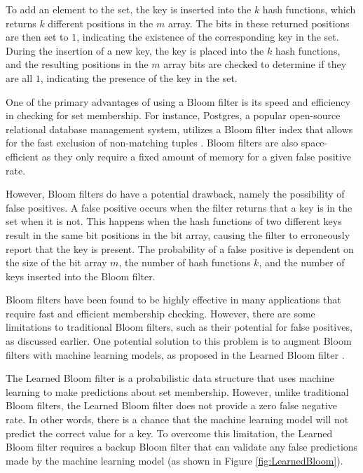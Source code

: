 To add an element to the set, the key is inserted into the $k$ hash functions, which returns $k$ different positions in the $m$ array. The bits in these returned positions are then set to $1$, indicating the existence of the corresponding key in the set. During the insertion of a new key, the key is placed into the $k$ hash functions, and the resulting positions in the $m$ array bits are checked to determine if they are all $1$, indicating the presence of the key in the set.

One of the primary advantages of using a Bloom filter is its speed and efficiency in checking for set membership. For instance, Postgres, a popular open-source relational database management system, utilizes a Bloom filter index that allows for the fast exclusion of non-matching tuples \cite{postgresqlBloom}. Bloom filters are also space-efficient as they only require a fixed amount of memory for a given false positive rate.

However, Bloom filters do have a potential drawback, namely the possibility of false positives. A false positive occurs when the filter returns that a key is in the set when it is not. This happens when the hash functions of two different keys result in the same bit positions in the bit array, causing the filter to erroneously report that the key is present. The probability of a false positive is dependent on the size of the bit array $m$, the number of hash functions $k$, and the number of keys inserted into the Bloom filter.

Bloom filters have been found to be highly effective in many applications that require fast and efficient membership checking. However, there are some limitations to traditional Bloom filters, such as their potential for false positives, as discussed earlier. One potential solution to this problem is to augment Bloom filters with machine learning models, as proposed in the Learned Bloom filter \cite{LearnedBloom}.

The Learned Bloom filter is a probabilistic data structure that uses machine learning to make predictions about set membership. However, unlike traditional Bloom filters, the Learned Bloom filter does not provide a zero false negative rate. In other words, there is a chance that the machine learning model will not predict the correct value for a key. To overcome this limitation, the Learned Bloom filter requires a backup Bloom filter that can validate any false predictions made by the machine learning model (as shown in Figure \ref{fig:LearnedBloom}).

